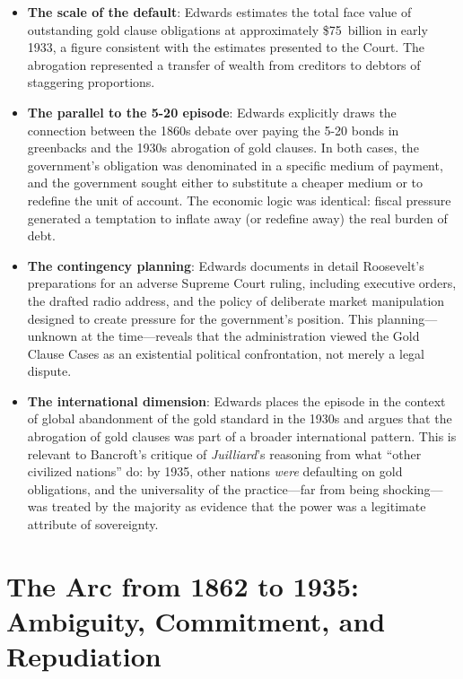 \documentclass[12pt]{article}
\begin{document}
\begin{itemize}

\item \textbf{The scale of the default}: Edwards estimates the total
face value of outstanding gold clause obligations at approximately
\$75~billion in early 1933, a figure consistent with the estimates
presented to the Court. The abrogation represented a transfer of wealth
from creditors to debtors of staggering proportions.

\item \textbf{The parallel to the 5-20 episode}: Edwards explicitly
draws the connection between the 1860s debate over paying the 5-20
bonds in greenbacks and the 1930s abrogation of gold clauses. In both
cases, the government's obligation was denominated in a specific medium
of payment, and the government sought either to substitute a cheaper
medium or to redefine the unit of account. The economic logic was
identical: fiscal pressure generated a temptation to inflate away (or
redefine away) the real burden of debt.

\item \textbf{The contingency planning}: Edwards documents in detail
Roosevelt's preparations for an adverse Supreme Court ruling, including
executive orders, the drafted radio address, and the policy of
deliberate market manipulation designed to create pressure for the
government's position. This planning---unknown at the time---reveals
that the administration viewed the Gold Clause Cases as an existential
political confrontation, not merely a legal dispute.

\item \textbf{The international dimension}: Edwards places the episode
in the context of global abandonment of the gold standard in the 1930s
and argues that the abrogation of gold clauses was part of a broader
international pattern. This is relevant to Bancroft's critique of
\textit{Juilliard}'s reasoning from what ``other civilized nations''
do: by 1935, other nations \textit{were} defaulting on gold
obligations, and the universality of the practice---far from being
shocking---was treated by the majority as evidence that the power was a
legitimate attribute of sovereignty.

\end{itemize}

\section{The Arc from 1862 to 1935: Ambiguity, Commitment, and
Repudiation}
\end{document}
